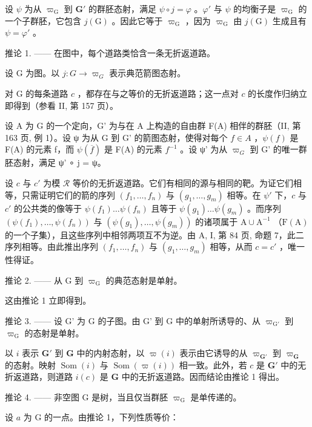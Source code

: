 设 \(\psi\) 为从 \(\varpi_{\mathrm{G}}\) 到 \(\mathbf{G}'\) 的群胚态射，满足 \(\psi \circ j = \varphi\) 。\(\varphi'\) 与 \(\psi\) 的均衡子是 \(\varpi_{\mathrm{G}}\) 的一个子群胚，它包含 \(j(\mathrm{G})\) 。因此它等于 \(\varpi_{\mathrm{G}}\) ，因为 \(\varpi_{\mathrm{G}}\) 由 \(j(\mathrm{G})\) 生成且有 \(\psi = \varphi'\) 。

推论 1. —— 在图中，每个道路类恰含一条无折返道路。

设 G 为图。以 \(j\colon G\to\varpi_{G}\) 表示典范箭图态射。

对 G 的每条道路 \(c\) ，都存在与之等价的无折返道路；这一点对 \(c\) 的长度作归纳立即得到（参看 II, 第 157 页）。

设 A 为 G 的一个定向，G' 为与在 A 上构造的自由群 F(A) 相伴的群胚（II, 第 163 页, 例 1）。设 ψ 为从 G 到 G' 的箭图态射，使得对每个 \(f \in A\) ，\(\psi(f)\) 是 F(A) 的元素 f，而 \(\psi(\overline{f})\) 是 F(A) 的元素 \(f^{-1}\) 。设 ψ' 为从 \(\varpi_{G}\) 到 G' 的唯一群胚态射，满足 ψ' ∘ j = ψ。

设 \(c\) 与 \(c'\) 为模 \(\mathcal{R}\) 等价的无折返道路。它们有相同的源与相同的靶。为证它们相等，只需证明它们的箭的序列 \((f_1, \ldots, f_n)\) 与 \((g_1, \ldots, g_m)\) 相等。在 \(\psi'\) 下，\(c\) 与 \(c'\) 的公共类的像等于 \(\psi(f_1) \ldots \psi(f_n)\) 且等于 \(\psi(g_1) \ldots \psi(g_m)\) 。而序列 \((\psi(f_1), \ldots, \psi(f_n))\) 与 \((\psi(g_1), \ldots, \psi(g_m))\) 的诸项属于 \(\mathrm{A} \cup \mathrm{A}^{-1}\) （\(\mathrm{F(A)}\) 的一个子集），且这些序列中相邻两项互不为逆。由 A, I, 第 84 页, 命题 7，此二序列相等。由此推出序列 \((f_{1},\ldots,f_{n})\) 与 \((g_{1},\ldots,g_{m})\) 相等，从而 \(c=c'\) ，唯一性得证。

推论 2. —— 从 G 到 \(\varpi_{\mathrm{G}}\) 的典范态射是单射。

这由推论 1 立即得到。

推论 3. —— 设 G' 为 G 的子图。由 G' 到 G 中的单射所诱导的、从 \(\varpi_{\mathrm{G}'}\) 到 \(\varpi_{\mathrm{G}}\) 的态射是单射。

以 \(i\) 表示 \(\mathbf{G}'\) 到 \(\mathbf{G}\) 中的内射态射，以 \(\varpi(i)\) 表示由它诱导的从 \(\varpi_{\mathbf{G}'}\) 到 \(\varpi_{\mathbf{G}}\) 的态射。映射 \(\operatorname{Som}(i)\) 与 \(\operatorname{Som}(\varpi(i))\) 相一致。此外，若 \(c\) 是 \(\mathbf{G}'\) 中的无折返道路，则道路 \(i(c)\) 是 \(\mathbf{G}\) 中的无折返道路。因而结论由推论 1 得出。

推论 4. —— 非空图 G 是树，当且仅当群胚 \(\varpi_{\mathrm{G}}\) 是单传递的。

设 \(a\) 为 G 的一点。由推论 1，下列性质等价：

